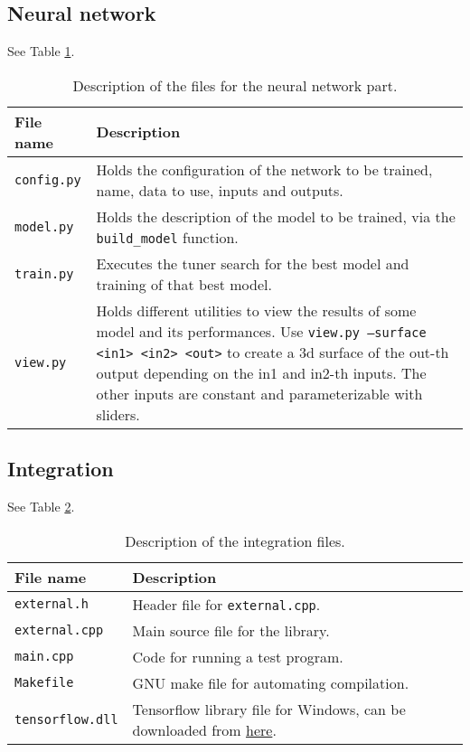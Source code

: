 \subsection*{Neural network}

See Table \ref{tab:annex-files-nn}.

\begin{table}[h]
    \centering
    \begin{tabular}{|p{}|p{}|}
        \hline
        File name & Description \\ \hline
        \texttt{config.py} & Holds the configuration of the network to be trained, name, data to use, inputs and outputs. \\
        \texttt{model.py} & Holds the description of the model to be trained, via the \texttt{build\_model} function. \\
        \texttt{train.py} & Executes the tuner search for the best model and training of that best model. \\
        \texttt{view.py} & Holds different utilities to view the results of some model and its performances. Use \texttt{view.py --surface <in1> <in2> <out>} to create a 3d surface of the out-th output depending on the in1 and in2-th inputs. The other inputs are constant and parameterizable with sliders. \\
        \hline
    \end{tabular}
    \caption{Description of the files for the neural network part.}
    \label{tab:annex-files-nn}
\end{table}

\subsection*{Integration}

See Table \ref{tab:annex-files-integration}.

\begin{table}[h]
    \centering
    \begin{tabular}{|p{}|p{}|}
        \hline
        File name & Description \\ \hline
        \texttt{external.h} & Header file for \texttt{external.cpp}. \\
        \texttt{external.cpp} & Main source file for the library. \\
        \texttt{main.cpp} & Code for running a test program. \\
        \texttt{Makefile} & GNU make file for automating compilation. \\
        \texttt{tensorflow.dll} & Tensorflow library file for Windows, can be downloaded from \href{https://www.tensorflow.org/install/lang_c}{here}. \\
        \hline
    \end{tabular}
    \caption{Description of the integration files.}
    \label{tab:annex-files-integration}
\end{table}

